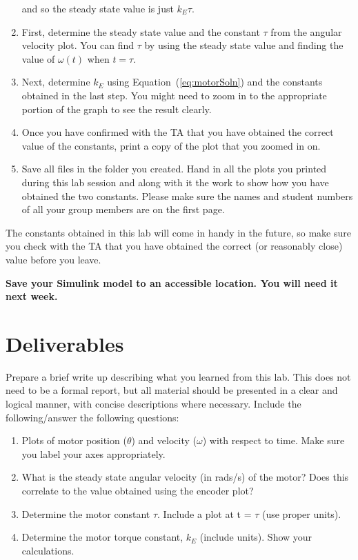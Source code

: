 \begin{enumerate}
and so the steady state value is just $k_{E}\tau$\@.
\item First, determine the steady state value and the constant $\tau$ from
the angular velocity plot.  You can find $\tau$ by using the steady state
value and finding the value of $\omega(t)$ when $t=\tau$\@.
\item Next, determine $k_{E}$ using Equation~(\ref{eq:motorSoln}) and the
constants obtained in the last step.  You might need to zoom in to the
appropriate portion of the graph to see the result clearly.
\item Once you have confirmed with the TA that you have obtained the correct
value of the constants, print a copy of the plot that you zoomed in on.
\item Save all files in the folder you created.  Hand in all the plots you
printed during this lab session and along with it the work to show how you
have obtained the two constants.  Please make sure the names and student
numbers of all your group members are on the first page.
\end{enumerate}
The constants obtained in this lab will come in handy in the future, so make
sure you check with the TA that you have obtained the correct (or reasonably
close) value before you leave.

\textbf{Save your Simulink model to an accessible location. You will need it next week.}

\section{Deliverables}

Prepare a brief write up describing what you learned from this lab. 
This does not need to be a formal report, but all material should be presented in 
a clear and logical manner, with concise descriptions where necessary. Include 
the following/answer the following questions:
\begin{enumerate}
\item Plots of motor position ($\theta$) and velocity ($\omega$) with respect to time. Make sure you label your axes appropriately.
\item What is the steady state angular velocity (in rads/s) of the motor? 
Does this correlate to the value obtained using the encoder plot?
\item Determine the motor constant $\tau$. Include a plot at t = $\tau$ (use proper units).
\item Determine the motor torque constant, $k_E$ (include units). Show your calculations.
\end{enumerate}

